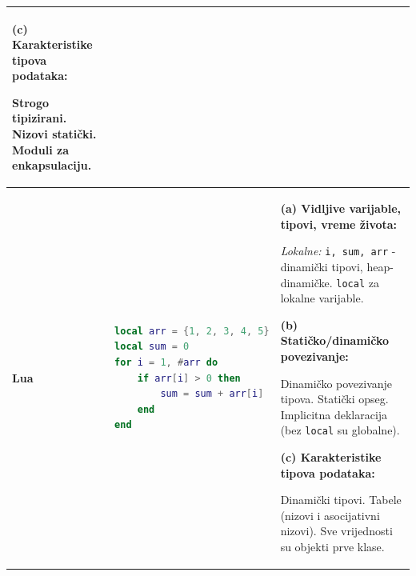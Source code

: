 \documentclass[12pt,a4paper]{article}
\begin{document}
\begin{longtable}{|p{2cm}|p{5cm}|p{8cm}|}
\vspace{0.2cm}
\textbf{(c) Karakteristike tipova podataka:}

Strogo tipizirani. Nizovi statički. Moduli za enkapsulaciju. \\
\hline

\textbf{Lua} & 
\begin{lstlisting}[language=Lua]
local arr = {1, 2, 3, 4, 5}
local sum = 0
for i = 1, #arr do
    if arr[i] > 0 then
        sum = sum + arr[i]
    end
end
\end{lstlisting} & 
\textbf{(a) Vidljive varijable, tipovi, vreme života:}

\textit{Lokalne:} \texttt{i, sum, arr} - dinamički tipovi, heap-dinamičke. \texttt{local} za lokalne varijable.

\vspace{0.2cm}
\textbf{(b) Statičko/dinamičko povezivanje:}

Dinamičko povezivanje tipova. Statički opseg. Implicitna deklaracija (bez \texttt{local} su globalne).

\vspace{0.2cm}
\textbf{(c) Karakteristike tipova podataka:}

Dinamički tipovi. Tabele (nizovi i asocijativni nizovi). Sve vrijednosti su objekti prve klase. \\
\hline

\end{longtable}
\end{document}
